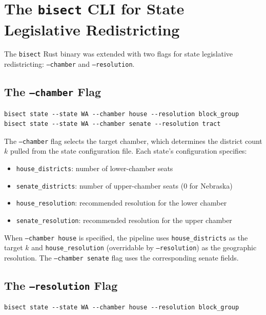 \section{The \texttt{bisect} CLI for State Legislative Redistricting}
\label{sec:cli}

The \texttt{bisect} Rust binary was extended with two flags for state legislative
redistricting: \texttt{--chamber} and \texttt{--resolution}.

\subsection{The \texttt{--chamber} Flag}
\label{sec:cli:chamber}

\begin{verbatim}
bisect state --state WA --chamber house --resolution block_group
bisect state --state WA --chamber senate --resolution tract
\end{verbatim}

The \texttt{--chamber} flag selects the target chamber, which determines the
district count $k$ pulled from the state configuration file. Each state's
configuration specifies:
\begin{itemize}
  \item \texttt{house\_districts}: number of lower-chamber seats
  \item \texttt{senate\_districts}: number of upper-chamber seats (0 for Nebraska)
  \item \texttt{house\_resolution}: recommended resolution for the lower chamber
  \item \texttt{senate\_resolution}: recommended resolution for the upper chamber
\end{itemize}

When \texttt{--chamber house} is specified, the pipeline uses
\texttt{house\_districts} as the target $k$ and \texttt{house\_resolution}
(overridable by \texttt{--resolution}) as the geographic resolution.
The \texttt{--chamber senate} flag uses the corresponding senate fields.

\subsection{The \texttt{--resolution} Flag}
\label{sec:cli:resolution}

\begin{verbatim}
bisect state --state WA --chamber house --resolution block_group
\end{verbatim}


